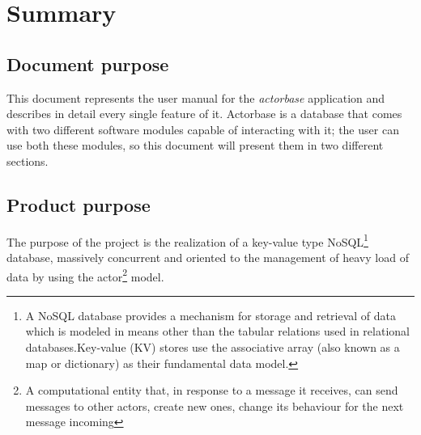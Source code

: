 \documentclass{scalatekids-article}
\begin{document}
\section{Summary}

\subsection{Document purpose}
This document represents the user manual for the \textit{actorbase} application
and describes in detail every single feature of it. Actorbase is a database that
comes with two different software modules capable of interacting with it; the
user can use both these modules, so this document will present them in two
different sections.

\subsection{Product purpose}

The purpose of the project is the realization of a key-value type
NoSQL\footnote{A NoSQL database provides a mechanism for storage and retrieval
of data which is modeled in means other than the tabular relations used in
relational databases.Key-value (KV) stores use the associative array (also known
as a map or dictionary) as their fundamental data model.\label{nosql}} database,
massively concurrent and oriented to the management of heavy load of data by
using the actor\footnote{A computational entity that, in response to a message
it receives, can send messages to other actors, create new ones, change its
behaviour for the next message incoming\label{actor}} model.




\end{document}
